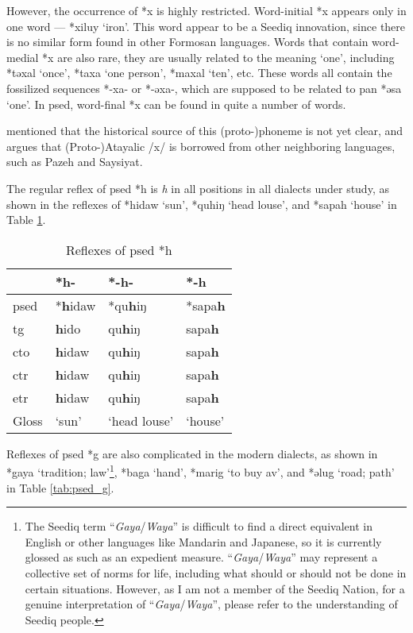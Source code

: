 However, the occurrence of *x is highly restricted. Word-initial *x appears only in one word --- *xiluy `iron'. This word appear to be a Seediq innovation, since there is no similar form found in other Formosan languages. Words that contain word-medial *x are also rare, they are usually related to the meaning `one', including *təxal `once', *taxa `one person', *maxal `ten', etc. These words all contain the fossilized sequences *-xa- or *-əxa-, which are supposed to be related to \acs{pan} *əsa `one'. In \acl{psed}, word-final *x can be found in quite a number of words. 

\textcite{li1981paic} mentioned that the historical source of this (proto-)phoneme is not yet clear, and \textcite{song2024Aicx} argues that (Proto-)Atayalic /x/ is borrowed from other neighboring languages, such as Pazeh and Saysiyat. 

The regular reflex of \acl{psed} *h is \textit{h} in all positions in all dialects under study, as shown in the reflexes of *hidaw `sun', *quhiŋ `head louse', and *sapah `house' in Table \ref{tab:psed_h}.

\begin{table}[!htbp]
\centering
\caption{Reflexes of \acl{psed} *h}
\label{tab:psed_h}
\begin{tabular}{llll}
\hline
           & *h-    & *-h-         & *-h     \\ \hline
\acs{psed} & *\textbf{h}idaw & *qu\textbf{h}iŋ       & *sapa\textbf{h}  \\ \hdashline
\acs{tg}   & \textbf{h}ido   & qu\textbf{h}iŋ        & sapa\textbf{h}   \\
\acs{cto}  & \textbf{h}idaw  & qu\textbf{h}iŋ        & sapa\textbf{h}   \\
\acs{ctr}  & \textbf{h}idaw  & qu\textbf{h}iŋ        & sapa\textbf{h}   \\
\acs{etr}  & \textbf{h}idaw  & qu\textbf{h}iŋ        & sapa\textbf{h}   \\ \hline
Gloss      & `sun'  & `head louse' & `house' \\ \hline
\end{tabular}
\end{table}

Reflexes of \acl{psed} *g are also complicated in the modern dialects, as shown in *gaya `tradition; law'\footnote{The Seediq term ``\textit{Gaya}/\textit{Waya}'' is difficult to find a direct equivalent in English or other languages like Mandarin and Japanese, so it is currently glossed as such as an expedient measure. ``\textit{Gaya}/\textit{Waya}'' may represent a collective set of norms for life, including what should or should not be done in certain situations. However, as I am not a member of the Seediq Nation, for a genuine interpretation of ``\textit{Gaya}/\textit{Waya}'', please refer to the understanding of Seediq people.}, *baga `hand', *marig `to buy \acs{av}', and *əlug `road; path' in Table \ref{tab:psed_g}.  

